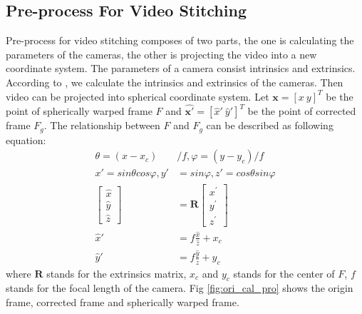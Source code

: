 \documentclass[conference]{IEEEtran}
\begin{document}
\subsection{Pre-process For Video Stitching}
\label{ssec:Pre-prepared}
Pre-process for video stitching composes of two parts, the one is calculating the parameters of the cameras, the other is projecting the video into a new coordinate
system. The parameters of a camera consist intrinsics and extrinsics. 
According to \cite{zhang2000flexible}, we calculate the intrinsics and extrinsics of the cameras.
Then video can be projected into spherical coordinate system.
Let $\textbf{x} = [x \ y]^T$ be the point of spherically
warped frame $F$ and $\hat{\textbf{x}'} = [\hat{x}' \ \hat{y}']^T$ be the point of corrected frame $F_g$.
The relationship between $F$ and $F_g$ can be described as following equation:
\begin{equation}
\begin{aligned}
\theta =\left(x-x_{c}\right) &/ f , \varphi =\left(y -y_{c}\right) / f \\
x'=sin\theta cos\varphi, y'&=sin\varphi, z'=cos\theta sin\varphi \\
\left[ \begin{array}{l}{\hat{x}} \\ {\hat{y}} \\ {\hat{z}}\end{array}\right]&=\textbf{R} \left[ \begin{array}{l}{x^{\prime}} \\ {y^{\prime}} \\ {z^{\prime}}\end{array}\right]\\
\hat{x}'&=f\frac{\hat{x}}{\hat{z}}+x_c\\
\hat{y}'&=f\frac{\hat{y}}{\hat{z}}+y_c
\end{aligned}
\end{equation}
where $\textbf{R}$ stands for the extrinsics matrix, $x_c$ and $y_c$ stands for the center of $F$, $f$ stands for the focal length of the camera.
Fig \ref{fig:ori_cal_pro} shows the origin frame, 
corrected frame and spherically
warped frame. 
\end{document}
